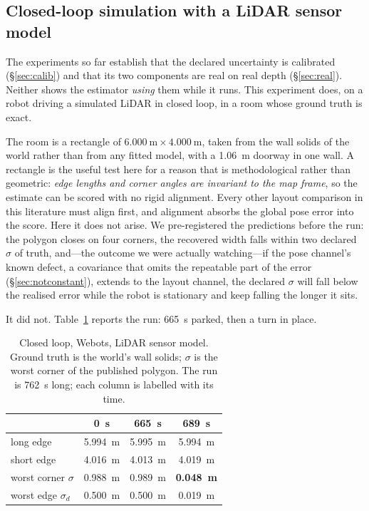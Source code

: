 \documentclass[conference,letterpaper,10pt]{IEEEtran}
\begin{document}
\subsection{Closed-loop simulation with a LiDAR sensor model}
\label{sec:webots}

The experiments so far establish that the declared uncertainty is calibrated
(\S\ref{sec:calib}) and that its two components are real on real depth (\S\ref{sec:real}). Neither
shows the estimator \emph{using} them while it runs. This experiment does, on a robot driving a
simulated LiDAR in closed loop, in a room whose ground truth is exact.

The room is a rectangle of $\SI{6.000}{\meter} \times \SI{4.000}{\meter}$, taken from the wall solids of the world rather
than from any fitted model, with a \SI{1.06}{\meter} doorway in one wall. A rectangle is the useful
test here for a reason that is methodological rather than geometric: \emph{edge lengths and corner
angles are invariant to the map frame}, so the estimate can be scored with no rigid alignment. Every
other layout comparison in this literature must align first, and alignment absorbs the global pose
error into the score. Here it does not arise. We pre-registered the predictions before the run: the
polygon closes on four corners, the recovered width falls within two declared $\sigma$ of truth,
and---the outcome we were actually watching---if the pose channel's known defect, a covariance that
omits the repeatable part of the error (\S\ref{sec:notconstant}), extends to the layout channel, the
declared $\sigma$ will fall below the realised error while the robot is stationary and keep falling
the longer it sits.

It did not. Table~\ref{tab:webots} reports the run: \SI{665}{\second} parked, then a turn in place.

\begin{table}[t]
\centering
\caption{Closed loop, Webots, LiDAR sensor model. Ground truth is the world's wall solids;
$\sigma$ is the worst corner of the published polygon. The run is \SI{762}{\second} long; each column
is labelled with its time.}
\label{tab:webots}
\begin{tabular}{lccc}
\toprule
 & \SI{0}{\second} & \SI{665}{\second} & \SI{689}{\second} \\
\midrule
long edge   & \SI{5.994}{\meter} & \SI{5.995}{\meter} & \SI{5.994}{\meter} \\
short edge  & \SI{4.016}{\meter} & \SI{4.013}{\meter} & \SI{4.019}{\meter} \\
worst corner $\sigma$ & \SI{0.988}{\meter} & \SI{0.989}{\meter} & \textbf{\SI{0.048}{\meter}} \\
worst edge $\sigma_d$ & \SI{0.500}{\meter} & \SI{0.500}{\meter} & \SI{0.019}{\meter} \\
\bottomrule
\end{tabular}
\end{table}
\end{document}
